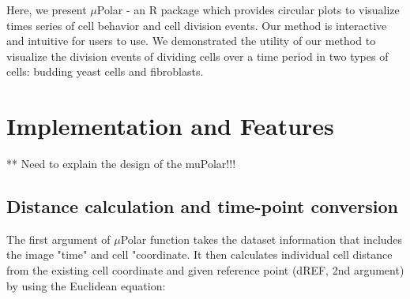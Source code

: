 \documentclass[conference]{IEEEtran}
\begin{document}
Here, we present $\mu$Polar - an R package which provides circular plots to visualize times series of cell behavior and cell division events. Our method is interactive and intuitive for users to use. We demonstrated the utility of our method to visualize the division events of dividing cells over a time period in two types of cells: budding yeast cells and fibroblasts. 


 
 
 
 
 


\section{Implementation and Features}

** Need to explain the design of the muPolar!!!


\subsection{Distance calculation and time-point conversion}
The first argument of $\mu$Polar function takes the dataset information that includes the image "time" and cell "coordinate. It then calculates individual cell distance from the existing cell coordinate and given reference point (dREF, 2nd argument) by using the Euclidean equation:
\end{document}
